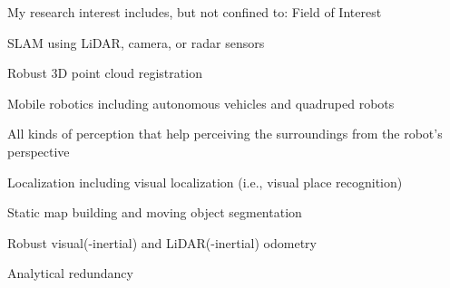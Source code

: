 \cventry
  {My research interest includes, but not confined to:} %
  {Field of Interest}%
  {} %
  {} %
  {
    \begin{cvitems} %
      \item {SLAM using LiDAR, camera, or radar sensors\lineintv}
      \item {Robust 3D point cloud registration\lineintv}
      \item {Mobile robotics including autonomous vehicles and quadruped robots\lineintv}
      \item {All kinds of perception that help perceiving the surroundings from the robot's perspective\lineintv}
      \item {Localization including visual localization (i.e., visual place recognition)\lineintv}
      \item {Static map building and moving object segmentation\lineintv}
      \item {Robust visual(-inertial) and LiDAR(-inertial) odometry\lineintv}
      \item {Analytical redundancy\lineintv}
    \end{cvitems}
  }

